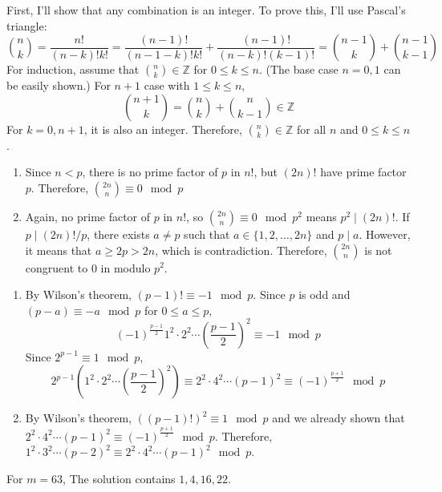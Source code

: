 \documentclass[12pt]{article}
\newenvironment{problem}[2][Problem]{\begin{trivlist}
\item[\hskip \labelsep {\bfseries #1}\hskip \labelsep {\bfseries #2.}]}{\end{trivlist}}
\begin{document}
\begin{problem}{2}
\end{problem}
First, I'll show that any combination is an integer. To prove this, I'll use Pascal's triangle:
\begin{equation*}
    \binom{n}{k}=\frac{n!}{(n-k)!k!}=\frac{(n-1)!}{(n-1-k)!k!}+\frac{(n-1)!}{(n-k)!(k-1)!}=\binom{n-1}{k}+\binom{n-1}{k-1}
\end{equation*}
For induction, assume that $\binom{n}{k}\in\mathbb{Z}$ for $0\leq k\leq n$. (The base case $n=0,1$ can be easily shown.) For $n+1$ case with $1\leq k\leq n$,
\begin{equation*}
    \binom{n+1}{k}=\binom{n}{k}+\binom{n}{k-1} \in\mathbb{Z}
\end{equation*}
For $k=0,n+1$, it is also an integer. Therefore, $\binom{n}{k}\in\mathbb{Z}$ for all $n$ and $0\leq k\leq n$.
\begin{enumerate}
    \item[(i)] Since $n<p$, there is no prime factor of $p$ in $n!$, but $(2n)!$ have prime factor $p$. Therefore, $\binom{2n}{n}\equiv 0 \mod p$
    \item[(ii)] Again, no prime factor of $p$ in $n!$, so $\binom{2n}{n}\equiv 0 \mod p^2$ means $p^2\mid (2n)!$. If $p\mid (2n)!/p$, there exists $a\neq p$ such that $a\in\{1,2,\ldots, 2n\}$ and $p\mid a$. However, it means that $a\geq 2p>2n$, which is contradiction. Therefore, $\binom{2n}{n}$ is not congruent to $0$ in modulo $p^2$.
\end{enumerate}
\begin{problem}{3}
\end{problem}
\begin{enumerate}
    \item [(i)] By Wilson's theorem, $(p-1)!\equiv -1 \mod p$. Since $p$ is odd and $(p-a)\equiv -a \mod p$ for $0\leq a\leq p$, \begin{equation*}
    (-1)^{\frac{p-1}{2}}1^2 \cdot 2^2 \cdots \left(\frac{p-1}{2}\right)^2\equiv -1 \mod p
\end{equation*}
Since $2^{p-1}\equiv 1 \mod p$,
\begin{equation*}
    2^{p-1}\left(1^2\cdot 2^2 \cdots \left(\frac{p-1}{2}\right)^2\right)\equiv 2^2\cdot 4^2\cdots (p-1)^2\equiv (-1)^{\frac{p+1}{2}} \mod p
\end{equation*}
    \item[(ii)] By Wilson's theorem, $\left((p-1)!\right)^2\equiv 1 \mod p$ and we already shown that $2^2\cdot 4^2\cdots (p-1)^2\equiv (-1)^{\frac{p+1}{2}} \mod p$. Therefore, $1^2\cdot 3^2\cdots (p-2)^2\equiv 2^2\cdot 4^2\cdots (p-1)^2 \mod p$.
\end{enumerate}
\newpage
\begin{problem}{4}
For $m=63$, The solution contains $1,4,16,22$.
\end{problem}
\end{document}
